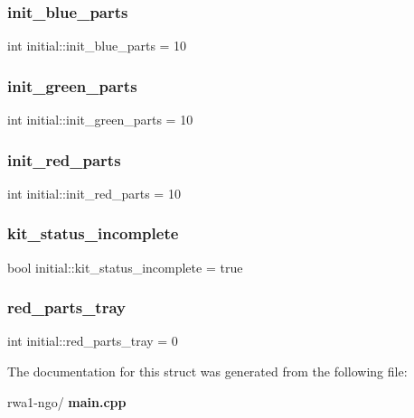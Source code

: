\mbox{\label{structinitial_ada9c4e872a09cb28d73700e2e0f7c654}} 
\subsubsection{init\+\_\+blue\+\_\+parts}
{\footnotesize\ttfamily int initial\+::init\+\_\+blue\+\_\+parts = 10}

\mbox{\label{structinitial_a72c2bd28ae428d6a27e2aa9e2310d340}} 
\subsubsection{init\+\_\+green\+\_\+parts}
{\footnotesize\ttfamily int initial\+::init\+\_\+green\+\_\+parts = 10}

\mbox{\label{structinitial_ac502bdbf50a76d4d0a9dda51b12c7439}} 
\subsubsection{init\+\_\+red\+\_\+parts}
{\footnotesize\ttfamily int initial\+::init\+\_\+red\+\_\+parts = 10}

\mbox{\label{structinitial_a647fc2891fa52559291cc41a431e020a}} 
\subsubsection{kit\+\_\+status\+\_\+incomplete}
{\footnotesize\ttfamily bool initial\+::kit\+\_\+status\+\_\+incomplete = true}

\mbox{\label{structinitial_a7949febd5932ef8c5a66ffd1ff15704a}} 
\subsubsection{red\+\_\+parts\+\_\+tray}
{\footnotesize\ttfamily int initial\+::red\+\_\+parts\+\_\+tray = 0}



The documentation for this struct was generated from the following file\+:\begin{DoxyCompactItemize}
\item 
rwa1-\/ngo/\textbf{ main.\+cpp}\end{DoxyCompactItemize}
